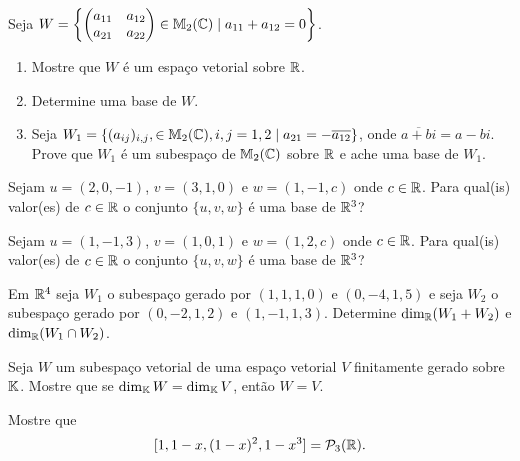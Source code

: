 \documentclass[12pt]{exam}
\begin{document}
    \begin{exercicio}
        Seja $W = \left\{\begin{pmatrix} a_{11} & a_{12}\\ a_{21} & a_{22}\end{pmatrix} \in \mathbb{M}_2(\mathbb{C}) \mid a_{11} + a_{12} = 0\right\}$.
        \begin{enumerate}[label={\alph*})]
            \item Mostre que $W$ \'e um espa\c{c}o vetorial sobre $\mathbb{R}$.
    
            \item Determine uma base de $W$.
    
            \item Seja $W_1 = \{(a_{ij})_{i,j}, \in \mathbb{M}_2(\mathbb{C}), i, j = 1, 2 \mid a_{21} = -\overline{a_{12}}\}$, onde $\overline{a + bi} = a - bi$. Prove que $W_1$ \'e um subespa\c{c}o de $\mathbb{M}_2(\mathbb{C})$ sobre $\mathbb{R}$ e ache uma base de $W_1$.
        \end{enumerate}
    \end{exercicio}

    \begin{exercicio}
        Sejam $u = (2, 0 , -1)$, $v = (3, 1 , 0)$ e $w = (1, -1 , c)$ onde $c \in \mathbb{R}$. Para qual(is) valor(es) de $c \in \mathbb{R}$ o conjunto $\{u, v, w\}$ \'e uma base de $\mathbb{R}^3$?
    \end{exercicio}

    \begin{exercicio}
        Sejam $u = (1, -1 , 3)$, $v = (1, 0 , 1)$ e $w = (1, 2 , c)$ onde $c \in \mathbb{R}$. Para qual(is) valor(es) de $c \in \mathbb{R}$ o conjunto $\{u, v, w\}$ \'e uma base de $\mathbb{R}^3$?
    \end{exercicio}

    \begin{exercicio}
        Em $\mathbb{R}^4$ seja $W_1$ o subespa\c{c}o gerado por $(1,1,1,0)$ e $(0,-4,1,5)$ e seja $W_2$ o subespa\c{c}o gerado por $(0,-2,1,2)$ e $(1,-1,1,3)$. Determine $\dim_{\mathbb{R}}(W_1 + W_2)$ e $\dim_{\mathbb{R}}(W_1 \cap W_2)$.
    \end{exercicio}

    \begin{exercicio}
        Seja $W$ um subespa\c{c}o vetorial de uma espa\c{c}o vetorial $V$ finitamente gerado sobre $\mathbb{K}$. Mostre que se $\dim_{\mathbb{K}}W = \dim_{\mathbb{K}}V$, ent\~ao $W = V$.
    \end{exercicio}

    \begin{exercicio}
        Mostre que 
        \[
            [1, 1 - x, (1 - x)^2, 1 - x^3] = \mathcal{P}_3(\mathbb{R}).
        \]
    \end{exercicio}
\end{document}
